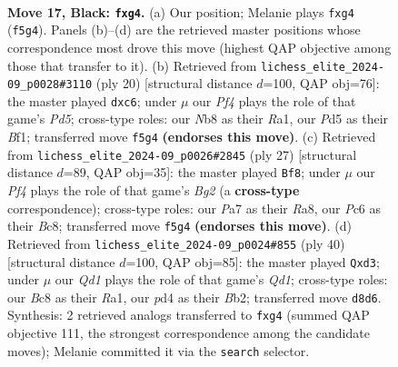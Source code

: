 \documentclass[11pt]{article}
\begin{document}
\clearpage

\begin{figure}[p]\centering
\begin{subfigure}{0.46\textwidth}\centering
\resizebox{\linewidth}{!}{%
\newchessgame
\chessboard[
  setfen={rnbq2k1/pp5p/2p1r2p/3p1p2/PP1P2Pb/2N1PP1P/2QKN3/R4B1R b - - 0 17},
  showmover=false,
  pgfstyle=straightmove, color=movearrow, markmove={f5-g4}
]}
\caption{}
\end{subfigure}\hfill
\begin{subfigure}{0.46\textwidth}\centering
\resizebox{\linewidth}{!}{%
\newchessgame
\chessboard[
  setfen={rn3rk1/ppq1ppb1/2p2np1/3P3p/2PP3P/1QN1BP2/PP3P2/R3KB1R w KQ - 3 11},
  showmover=false,
  pgfstyle=straightmove, color=movearrow, markmove={d5-c6}
]}
\caption{}
\end{subfigure}
\\[4pt]
\begin{subfigure}{0.46\textwidth}\centering
\resizebox{\linewidth}{!}{%
\newchessgame
\chessboard[
  setfen={rnbqr1k1/5pbp/2p2p1P/1p4p1/p2P1N2/P3P3/BP3PP1/RN1QK2R b KQ - 0 14},
  showmover=false,
  pgfstyle=straightmove, color=movearrow, markmove={g7-f8}
]}
\caption{}
\end{subfigure}\hfill
\begin{subfigure}{0.46\textwidth}\centering
\resizebox{\linewidth}{!}{%
\newchessgame
\chessboard[
  setfen={r3kbr1/p3np2/2n1p2p/q2pP1p1/3P1P2/3p2PB/PB3RNP/R2Q2K1 w q - 0 21},
  showmover=false,
  pgfstyle=straightmove, color=movearrow, markmove={d1-d3}
]}
\caption{}
\end{subfigure}
\caption{\textbf{Move 17, Black: \texttt{fxg4}.} (a) Our position; Melanie plays \texttt{fxg4} (\texttt{f5g4}). Panels (b)--(d) are the retrieved master positions whose correspondence most drove this move (highest QAP objective among those that transfer to it). (b) Retrieved from \texttt{lichess\_elite\_2024-09\_p0028\#3110} (ply 20) [structural distance $d$=100, QAP obj=76]: the master played \texttt{dxc6}; under $\mu$ our \emph{Pf4} plays the role of that game's \emph{Pd5}; cross-type roles: our \emph{N}b8 as their \emph{R}a1, our \emph{P}d5 as their \emph{B}f1; transferred move \texttt{f5g4} \textbf{(endorses this move)}. (c) Retrieved from \texttt{lichess\_elite\_2024-09\_p0026\#2845} (ply 27) [structural distance $d$=89, QAP obj=35]: the master played \texttt{Bf8}; under $\mu$ our \emph{Pf4} plays the role of that game's \emph{Bg2} (a \textbf{cross-type} correspondence); cross-type roles: our \emph{P}a7 as their \emph{R}a8, our \emph{P}c6 as their \emph{B}c8; transferred move \texttt{f5g4} \textbf{(endorses this move)}. (d) Retrieved from \texttt{lichess\_elite\_2024-09\_p0024\#855} (ply 40) [structural distance $d$=100, QAP obj=85]: the master played \texttt{Qxd3}; under $\mu$ our \emph{Qd1} plays the role of that game's \emph{Qd1}; cross-type roles: our \emph{B}c8 as their \emph{R}a1, our \emph{p}d4 as their \emph{B}b2; transferred move \texttt{d8d6}. Synthesis: 2 retrieved analogs transferred to \texttt{fxg4} (summed QAP objective 111, the strongest correspondence among the candidate moves); Melanie committed it via the \texttt{search} selector.}
\label{fig:thought-m33}
\end{figure}
\end{document}
